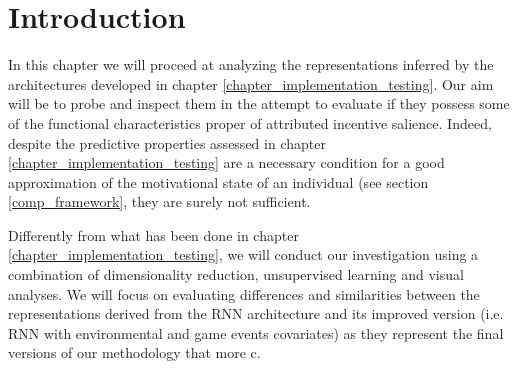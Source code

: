 \section{Introduction}
\label{representation_analysis_introduction}
In this chapter we will proceed at analyzing the representations inferred by the architectures developed in chapter \ref{chapter_implementation_testing}. Our aim will be to probe and inspect them in the attempt to evaluate if they possess some of the functional characteristics proper of attributed incentive salience. Indeed, despite the predictive properties assessed in chapter \ref{chapter_implementation_testing} are a necessary condition for a good approximation of the motivational state of an individual (see section \ref{comp_framework}, they are surely not sufficient. 

Differently from what has been done in chapter \ref{chapter_implementation_testing}, we will conduct our investigation using  a combination of dimensionality reduction, unsupervised learning and visual analyses. We will focus on evaluating differences and similarities between the representations derived from the RNN architecture and its improved version (i.e. RNN with environmental and game events covariates) as they represent the final versions of our methodology that more c. 

